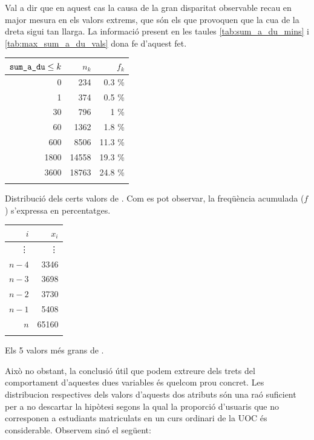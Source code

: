 \documentclass[
	a4paper,
	twoside,
	justified
]{tufte-book}
\begin{document}
Val a dir que en aquest cas la causa de la gran disparitat observable recau en major mesura en els valors extrems, que són els que provoquen que la cua de la dreta sigui tan llarga. La informació present en les taules \ref{tab:sum_a_du_mins} i \ref{tab:max_sum_a_du_vals} dona fe d'aquest fet.    

\begin{margintable}
    \begin{tabular}{rrr}
    \toprule
    $\texttt{sum\_a\_du} \leq k$ & $n_k$ & $f_k$ \\
    \midrule
    0 & 234 & 0.3 \% \\
    1 & 374 & 0.5 \% \\
    30 & 796 & 1 \% \\
    60 & 1362 & 1.8 \% \\
    600 & 8506 & 11.3 \% \\
    1800 & 14558 & 19.3 \% \\
    3600 & 18763 & 24.8 \% \\
    \bottomrule \\
    \end{tabular}
    
    \caption[]{
     \label{tab:sum_a_du_mins}
    Distribució dels certs valors de . Com es pot observar, la freqüència acumulada ($f$) s'expressa en percentatges.  
    }
  \end{margintable} 
  
\begin{margintable}
	\begin{center}
	\begin{tabular}{rr}
	\toprule
 	$i$ & $x_i$ \\
	\midrule
	\vdots & \vdots \\
	$n-4$ & 3346 \\
	$n-3$ & 3698 \\
	$n-2$ & 3730 \\
	$n-1$ & 5408 \\
	$n$   & 65160 \\ 
	\bottomrule \\
	\end{tabular}
	\end{center}
	\caption{
		\label{tab:max_sum_a_du_vals}
		Els 5 valors més grans de .  
	}
	\end{margintable}


Això no obstant, la conclusió útil que podem extreure dels trets del comportament d'aquestes dues variables és quelcom prou concret. Les distribucion respectives dels valors d'aquests dos atributs són una raó suficient per a no descartar la hipòtesi segons la qual la proporció d'usuaris que no corresponen a estudiants matriculats en un curs ordinari de la UOC és considerable. Observem sinó el següent:
\end{document}
